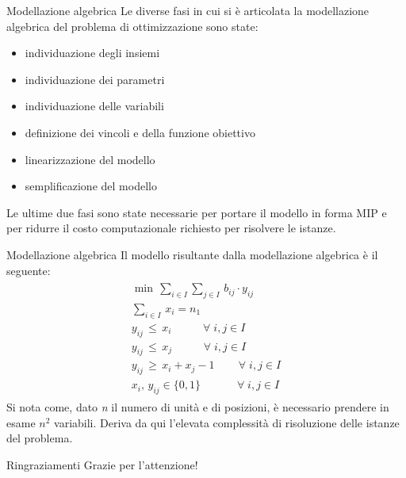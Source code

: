 \documentclass[a4paper]{beamer}
\begin{document}
\begin{frame}{Modellazione algebrica}
Le diverse fasi in cui si è articolata la modellazione algebrica del problema di ottimizzazione sono state:
\begin{itemize}
\item individuazione degli insiemi
\item individuazione dei parametri
\item individuazione delle variabili
\item definizione dei vincoli e della funzione obiettivo
\item linearizzazione del modello 
\item semplificazione del modello
\end{itemize}
\vfill
Le ultime due fasi sono state necessarie per portare il modello in forma MIP e per ridurre il costo computazionale richiesto 
per risolvere le istanze.
\end{frame}

\begin{frame}{Modellazione algebrica}
Il modello risultante dalla modellazione algebrica è il seguente:
\begin{align*}
	\begin{array}{l}
      \min \, \sum_{i\in I} \sum_{j\in I} \, b_{ij}\cdot y_{ij} \\
      \sum_{i\in I} \, x_{i} = n_1 \\
      y_{ij} \, \leq \, x_{i}   \;\;\;\qquad \forall \; i,j \in I \\ 
      y_{ij} \, \leq \, x_{j}   \;\;\;\qquad \forall \; i,j \in I \\
      y_{ij} \, \geq \, x_{i} + x_{j} - 1      \,\qquad \forall \; i,j \in I\\
      x_{i} ,\, y_{ij} \in \{0,1\}      \;\quad\qquad \forall \; i,j \in I
    \end{array}
\end{align*}
\vfill
Si nota come, dato \textit{n} il numero di unità e di posizioni, è necessario prendere in esame $n^2$ variabili. 
Deriva da qui l'elevata complessità di risoluzione delle istanze del problema.

\end{frame}

\begin{frame}{Ringraziamenti}
\centering
\LARGE Grazie per l'attenzione!
\end{frame}

\begin{frame}
\maketitle
\end{frame}
\end{document}

